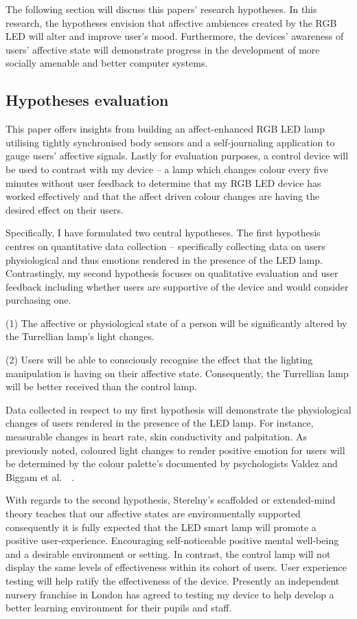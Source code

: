 \documentclass{sigchi}
\begin{document}
The following section will discuss this papers’ research hypotheses. In this research, the hypotheses envision that affective ambiences created by the RGB LED will alter and improve user’s mood. Furthermore, the devices’ awareness of users’ affective state will demonstrate progress in the development of more socially amenable and better computer systems. 

\subsection{Hypotheses evaluation}

This paper offers insights from building an affect-enhanced RGB LED lamp utilising tightly synchronised body sensors and a self-journaling application to gauge users’ affective signals. Lastly for evaluation purposes, a control device will be used to contrast with my device – a lamp which changes colour every five minutes without user feedback to determine that my RGB LED device has worked effectively and that the affect driven colour changes are having the desired effect on their users.

Specifically, I have formulated two central hypotheses. The first hypothesis centres on quantitative data collection – specifically collecting data on users physiological and thus emotions rendered in the presence of the LED lamp. Contrastingly, my second hypothesis focuses on qualitative evaluation and user feedback including whether users are supportive of the device and would consider purchasing one. 

(1) The affective or physiological state of a person will be significantly altered by the Turrellian lamp’s light changes.

(2) Users will be able to consciously recognise the effect that the lighting manipulation is having on their affective state. Consequently, the Turrellian lamp will be better received than the control lamp.

Data collected in respect to my first hypothesis will demonstrate the physiological changes of users rendered in the presence of the LED lamp. For instance, measurable changes in heart rate, skin conductivity and palpitation. As previously noted, coloured light changes to render positive emotion for users will be determined by the colour palette’s documented by psychologists Valdez and Biggam et al.~\cite{biggam2006progress}~\cite{valdez1994effects}. 

With regards to the second hypothesis, Sterelny’s scaffolded or extended-mind theory teaches that our affective states are environmentally supported consequently it is fully expected that the LED smart lamp will promote a positive user-experience. Encouraging self-noticeable positive mental well-being and a desirable environment or setting. In contrast, the control lamp will not display the same levels of effectiveness within its cohort of users. User experience testing will help ratify the effectiveness of the device. Presently an independent nursery franchise in London has agreed to testing my device to help develop a better learning environment for their pupils and staff.
\end{document}
